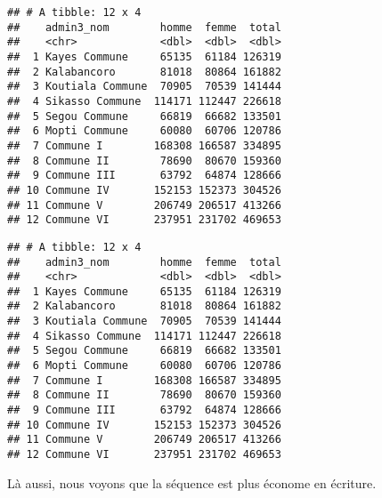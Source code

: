 \documentclass[]{book}
\newenvironment{Shaded}{\begin{snugshade}}{\end{snugshade}}
\newcommand{\KeywordTok}[1]{\textcolor[rgb]{0.13,0.29,0.53}{\textbf{#1}}}
\newcommand{\DataTypeTok}[1]{\textcolor[rgb]{0.13,0.29,0.53}{#1}}
\newcommand{\DecValTok}[1]{\textcolor[rgb]{0.00,0.00,0.81}{#1}}
\newcommand{\StringTok}[1]{\textcolor[rgb]{0.31,0.60,0.02}{#1}}
\newcommand{\CommentTok}[1]{\textcolor[rgb]{0.56,0.35,0.01}{\textit{#1}}}
\newcommand{\OperatorTok}[1]{\textcolor[rgb]{0.81,0.36,0.00}{\textbf{#1}}}
\newcommand{\NormalTok}[1]{#1}
\begin{document}
\begin{verbatim}
## # A tibble: 12 x 4
##    admin3_nom        homme  femme  total
##    <chr>             <dbl>  <dbl>  <dbl>
##  1 Kayes Commune     65135  61184 126319
##  2 Kalabancoro       81018  80864 161882
##  3 Koutiala Commune  70905  70539 141444
##  4 Sikasso Commune  114171 112447 226618
##  5 Segou Commune     66819  66682 133501
##  6 Mopti Commune     60080  60706 120786
##  7 Commune I        168308 166587 334895
##  8 Commune II        78690  80670 159360
##  9 Commune III       63792  64874 128666
## 10 Commune IV       152153 152373 304526
## 11 Commune V        206749 206517 413266
## 12 Commune VI       237951 231702 469653
\end{verbatim}

\begin{Shaded}
\end{Shaded}

\begin{verbatim}
## # A tibble: 12 x 4
##    admin3_nom        homme  femme  total
##    <chr>             <dbl>  <dbl>  <dbl>
##  1 Kayes Commune     65135  61184 126319
##  2 Kalabancoro       81018  80864 161882
##  3 Koutiala Commune  70905  70539 141444
##  4 Sikasso Commune  114171 112447 226618
##  5 Segou Commune     66819  66682 133501
##  6 Mopti Commune     60080  60706 120786
##  7 Commune I        168308 166587 334895
##  8 Commune II        78690  80670 159360
##  9 Commune III       63792  64874 128666
## 10 Commune IV       152153 152373 304526
## 11 Commune V        206749 206517 413266
## 12 Commune VI       237951 231702 469653
\end{verbatim}

Là aussi, nous voyons que la séquence est plus économe en écriture.
\end{document}
